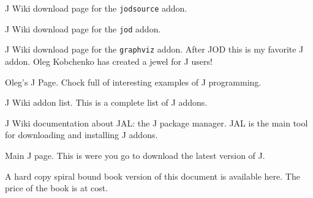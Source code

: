 \begin{description}
\item J Wiki download page for the \texttt{jodsource} addon.

               
\item J Wiki download page for the \texttt{jod} addon.


\item J Wiki download page for the \texttt{graphviz} addon. After JOD this is
my favorite J addon. Oleg Kobchenko has created a jewel for J users!


\item Oleg's J Page.  Chock full of interesting examples of J programming.

                     
\item J Wiki addon list.  This is a complete list of J addons.

                                 
\item J Wiki documentation about JAL: the J package manager.  JAL is
the main tool for downloading and installing J addons. 

                                              
\item Main J page.  This is were you go to download the latest version of J.  

                                              
\item A hard copy spiral bound book version of this document is available 
here.  The price of the book is at cost. 


\end{description}
